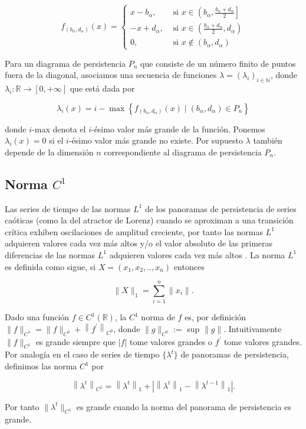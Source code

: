\[
f_{\left(b_{\alpha}, d_{\alpha}\right)}(x)= \begin{cases}x-b_{\alpha}, & \text { si } x \in\left(b_{\alpha}, \frac{b_{\alpha}+d_{\alpha}}{2}\right] \\ -x+d_{\alpha}, & \text { si } x \in\left(\frac{b_{\alpha}+d_{\alpha}}{2}, d_{\alpha}\right) \\ 0, & \text { si } x \notin\left(b_{\alpha}, d_{\alpha}\right)\end{cases}
\] 

Para un diagrama de persistencia $P_n$ que consiste de un número finito de puntos fuera de la diagonal, asociamos una secuencia de funciones $\lambda = (\lambda_i)_{i\in \mathbb{N}}$, donde $\lambda_i : \mathbb{R} \to [0,+\infty]$ que está dada por 

\[
\lambda_{i}(x)=i-\max \left\{f_{\left(b_{\alpha}, d_{\alpha}\right)}(x) \mid\left(b_{\alpha}, d_{\alpha}\right) \in P_{n}\right\}
\]

donde $i$-max denota el $i$-ésimo valor más grande de la función. Ponemos $\lambda_i (x) = 0$ si el $i$-ésimo valor más grande no existe. Por supuesto $\lambda$ también depende de la dimensión $n$ correspondiente al diagrama de persistencia $P_n$. 


\subsection{Norma $C^1$}
\label{normastopologicas}
Las series de tiempo de las normas $L^1$ de los panoramas de persistencia de series caóticas (como la del atractor de Lorenz) cuando se aproximan a una transición crítica  exhiben oscilaciones de amplitud creciente, por tanto las normas $L^1$ adquieren valores cada vez más altos y/o el valor absoluto de las primeras diferencias de las normas $L^1$ adquieren valores cada vez más altos \parencite{gideaTopologicalRecognitionCritical2020}.
La norma $L^1$ es definida como sigue, si $X = (x_1,x_2,..,x_n)$ entonces

\[ \|X\|_{1} = \sum_{i=1}^{n} \|x_{i}\|. \]


Dado una función $f \in C^1(\mathbb{R})$, la $C^1$ norma de $f$ es, por definición $\|f\|_{C^{1}}=\|f\|_{C^{0}}+\left\|f^{\prime}\right\|_{C^{0}}$, donde $\|g\|_{C^0} :=$ sup $\|g\|$. Intuitivamente $\|f\|_{C^{1}}$ es grande siempre que $|f|$ tome valores grandes o $f^{\prime}$ tome valores grandes. Por analogía en el caso de series de tiempo $\{\lambda^t \}$ de panoramas de persistencia, definimos las norma $C^1$ por 

\[
\left\|\lambda^{t}\right\|_{C^{1}}=\left\|\lambda^{t}\right\|_{1}+\left|\left\|\lambda^{t}\right\|_{1}-\left\|\lambda^{t-1}\right\|_{1}\right|.
\]

Por tanto $\|\lambda^t\|_{C^1}$ es grande cuando la norma del panorama de persistencia es grande.

























